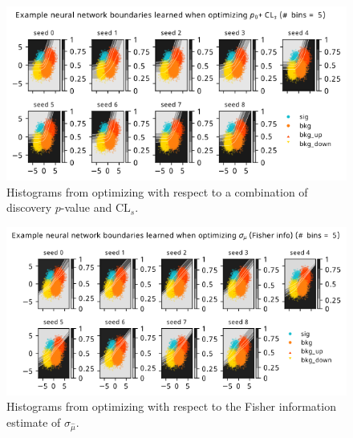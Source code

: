 \documentclass[
  11pt,
  numbers=noendperiod]{book}
\begin{document}
\begin{figure}

{\centering \includegraphics{./images/new-grid-models-COMB-5bin.png}

}

\caption{Histograms from optimizing with respect to a combination of
discovery \(p\)-value and \(\mathrm{CL}_s\).}

\end{figure}

\begin{figure}

{\centering \includegraphics{./images/new-grid-models-poi_uncert-5bin.png}

}

\caption{Histograms from optimizing with respect to the Fisher
information estimate of \(\sigma_{\hat{\mu}}\).}

\end{figure}
\end{document}
